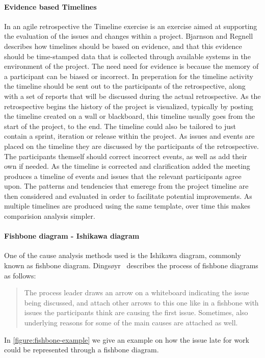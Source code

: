 \documentclass[12pt]{article}
\begin{document}
\paragraph{Evidence based Timelines}

In an agile retrospective the Timeline exercise is an exercise aimed at supporting the evaluation of the issues and changes within a project. Bjarnson and Regnell~\cite{Bjarnason2012} describes how timelines should be based on evidence, and that this evidence should be time-stamped data that is collected through available systems in the environment of the project. The need need for evidence is because the memory of a participant can be biased or incorrect. In preperation for the timeline activity the timeline should be sent out to the participants of the retrospective, along with a set of reports that will be discussed during the actual retrospective. As the retrospective begins the history of the project is visualized, typically by posting the timeline created on a wall or blackboard, this timeline usually goes from the start of the project, to the end. The timeline could also be tailored to just contain a sprint, iteration or release within the project. As issues and events are placed on the timeline they are discussed by the participants of the retrospective. The participants themself should correct incorrect events, as well as add their own if needed. As the timeline is corrected and clarification added the meeting produces a timeline of events and issues that the relevant participants agree upon. The patterns and tendencies that emerege from the project timeline are then considered and evaluated in order to facilitate potential improvements. As multiple timelines are produced using the same template, over time this makes comparision analysis simpler. 


\paragraph{Fishbone diagram - Ishikawa diagram}
One of the cause analysis methods used is the Ishikawa diagram, commonly known as fishbone diagram. Dingsøyr~\cite{Dingsoyr2005} describes the process of fishbone diagrams as follows:
\begin{quote} The process leader draws an arrow on a whiteboard indicating the issue being discussed, and attach other arrows to this one like in a fishbone with issues the participants think are causing the first issue. Sometimes, also underlying reasons for some of the main causes are attached as well.
\end{quote}
In \autoref{figure:fishbone-example} we give an example on how the issue late for work could be represented through a fishbone diagram. 
\end{document}
